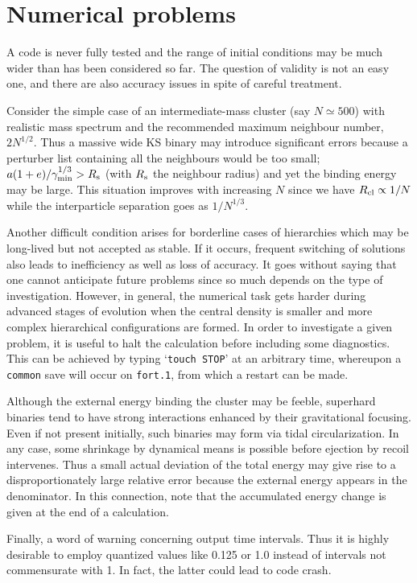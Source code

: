 \documentclass[12pt]{article}
\begin{document}
\section{Numerical problems}

A code is never fully tested and the range of initial conditions may be
much wider than has been considered so far.
The question of validity is not an easy one, and there are also accuracy
issues in spite of careful treatment.

Consider the simple case of an intermediate-mass cluster
(say $N \simeq 500$) with realistic mass spectrum and the recommended
maximum neighbour number, $2 N^{1/2}$.
Thus a massive wide KS binary may introduce significant errors because a
perturber list containing all the neighbours would be too small; \ie
$a (1 + e)/ \gamma_{\rm min}^{1/3} > R_{\rm s}$ (with $R_{\rm s}$ the
neighbour radius) and yet the binding energy may be large.
This situation improves with increasing $N$ since we have
$R_{\rm cl} \propto 1/N$ while the interparticle separation goes as
$1/N^{1/3}$.

Another difficult condition arises for borderline cases of hierarchies which
may be long-lived but not accepted as stable.
If it occurs, frequent switching of solutions also leads to inefficiency as
well as loss of accuracy.
It goes without saying that one cannot anticipate future problems since so
much depends on the type of investigation.
However, in general, the numerical task gets harder during advanced stages of
evolution when the central density is smaller and more complex hierarchical
configurations are formed.
In order to investigate a given problem, it is useful to halt the
calculation before including some diagnostics.
This can be achieved by typing `{\tt touch STOP}' at an arbitrary time,
whereupon a {\tt common} save will occur on {\tt fort.1}, from which a
restart can be made.

Although the external energy binding the cluster may be feeble, superhard
binaries tend to have strong interactions enhanced by their gravitational
focusing.
Even if not present initially, such binaries may form via tidal
circularization.
In any case, some shrinkage by dynamical means is possible before ejection
by recoil intervenes.
Thus a small actual deviation of the total energy may give rise to a
disproportionately large relative error because the external energy appears
in the denominator.
In this connection, note that the accumulated energy change is
given at the end of a calculation.

Finally, a word of warning concerning output time intervals.
Thus it is highly desirable to employ quantized values like 0.125 or 1.0
instead of intervals not commensurate with 1. In fact, the latter could
lead to code crash.
\end{document}

